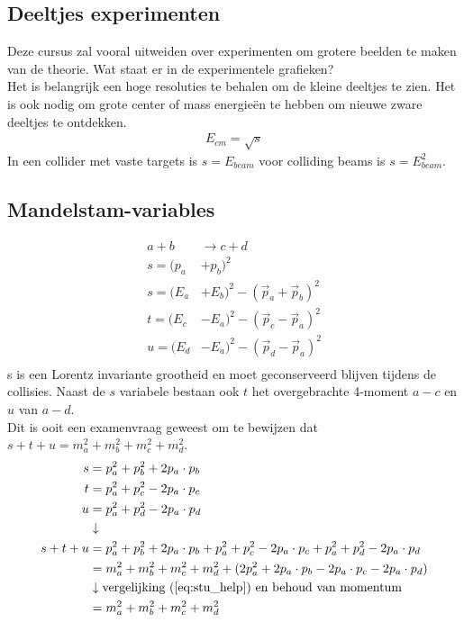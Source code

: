 \documentclass[../main.tex]{subfiles}
\begin{document}
\subsection{Deeltjes experimenten}%
\label{sub:deeltjes_experimenten}

Deze cursus zal vooral uitweiden over experimenten om grotere beelden te maken van de theorie. Wat staat er in de experimentele grafieken?\\
Het is belangrijk een hoge resoluties te behalen om de kleine deeltjes te zien. Het is ook nodig om grote center of mass energieën te hebben om nieuwe zware deeltjes te ontdekken.
\begin{equation}
    \begin{aligned}
        \label{eq:E_cm}
        E_{cm} = \sqrt{s}
    \end{aligned}
\end{equation}
In een collider met vaste targets is $s=E_{beam}$ voor colliding beams is $s=E_{beam}^2$.

\subsection{Mandelstam-variables}%
\label{sub:mandelstam_variables}

\begin{equation}
    \begin{aligned}
        \label{eq:mandelstam}
        a+b&\rightarrow c+d\\
        s=(p_a&+p_b)^2\\
        s=(E_a&+E_b)^2-(\vec{p}_a + \vec{p}_b)^2\\
        t=(E_c&-E_a)^2-(\vec{p}_c - \vec{p}_a)^2\\
        u=(E_d&-E_a)^2-(\vec{p}_d - \vec{p}_a)^2\\
    \end{aligned}
\end{equation}
s is een Lorentz invariante grootheid en moet geconserveerd blijven tijdens de collisies. Naast de $s$ variabele bestaan ook $t$ het overgebrachte 4-moment $a-c$ en $u$ van $a-d$.\\
Dit is ooit een examenvraag geweest om te bewijzen dat $s+t+u=m_a^2+m_b^2+m_c^2+m_d^2$.
\begin{equation}
    \begin{aligned}
        \label{eq:stu_bewijs}
        s&=p_a^2+p_b^2+2p_a\cdot p_b\\
        t&=p_a^2+p_c^2-2p_a\cdot p_c\\
        u&=p_a^2+p_d^2-2p_a\cdot p_d\\
         &\downarrow\\
        s+t+u&=p_a^2+p_b^2+2p_a\cdot p_b + p_a^2+p_c^2-2p_a\cdot p_c + p_a^2+p_d^2-2p_a\cdot p_d\\
             &=m_a^2+m_b^2+m_c^2+m_d^2+(2p_a^2+2p_a\cdot p_b-2p_a\cdot p_c-2p_a\cdot p_d)\\
             &\downarrow \text{vergelijking (\ref{eq:stu_help}) en behoud van momentum}\\
             &=m_a^2+m_b^2+m_c^2+m_d^2
    \end{aligned}
\end{equation}
\end{document}
